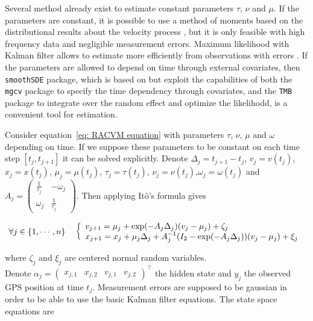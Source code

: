\documentclass[11pt]{article}
\newcommand {\1}{\mathbb{1}}
\begin{document}
Several method already exist to estimate constant parameters $\tau$, $\nu$ and $\mu$.
If the parameters are constant, it is possible to use a method of moments based on the distributional results about the velocity process \cite{gurarie_correlated_2017}, but it is only feasible with high frequency data and negligible measurement errors. Maximum likelihood with Kalman filter allows to estimate more efficiently from observations with errors \cite{johnson_continuoustime_2008}.
If the parameters are allowed to depend on time through external covariates, then \texttt{smoothSDE} package, which is based on \cite{johnson_continuoustime_2008} but exploit the capabilities of both the \texttt{mgcv} package \cite{wood_generalized_2017} to specify the time dependency through covariates, and the \texttt{TMB} \cite{kristensen_tmb_2016} package to integrate over the random effect and optimize the likelihodd, is a convenient tool for estimation. 

Consider equation~\ref{eq: RACVM equation} with parameters $\tau$, $\nu$, $\mu$ and $\omega$ depending on time.
If we suppose these parameters to be constant on each time step $[t_j,t_{j+1}]$ it can be solved explicitly. Denote $\Delta_j=t_{j+1}-t_j$, $v_j=v(t_j)$, $x_j=x(t_j)$, $\mu_j=\mu(t_j)$, $\tau_j=\tau(t_j)$, $\nu_j=\nu(t_j)$,$\omega_j=\omega(t_j)$ and $A_j=\begin{pmatrix} 
	\frac{1}{\tau_j} & -\omega_j \\
	\omega_j & \frac{1}{\tau_j}
\end{pmatrix}$. Then applying Itô's formula gives

\begin{equation}
	\forall j \in \{1, \cdots, n\} \quad 
	\left\{ \begin{array}{l}
		v_{j+1}=\mu_j +\exp(-A_j\Delta_j)(v_j-\mu_j)+\zeta_j \\
		x_{j+1}=x_j+\mu_j \Delta_j+A_j^{-1}(I_2-\exp(-A_j\Delta_j))(v_j-\mu_j)+\xi_j
	\end{array}\right. \\
	\label{eq: RCVM autoregressive formula}
\end{equation}


where $\zeta_j$ and $\xi_j$ are centered normal random variables.\\
Denote $\alpha_j=\begin{pmatrix} x_{j,1}  & x_{j,2} & v_{j,1} & v_{j,2}\end{pmatrix}^\top$ the hidden state and $y_j$ the observed GPS position at time $t_j$. Measurement errors are supposed to be gaussian in order to be able to use the basic Kalman filter equations. The state space equations are
\end{document}
